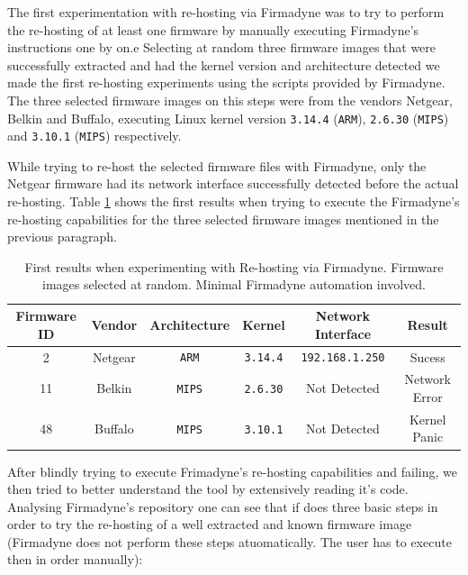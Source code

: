 
The first experimentation with re-hosting via Firmadyne was to try to perform the re-hosting of at least one firmware by manually executing Firmadyne's instructions one by on.e Selecting at random three firmware images that were successfully extracted and had the kernel version and architecture detected we made the first re-hosting experiments using the scripts provided by Firmadyne. The three selected firmware images on this steps were from the vendors Netgear, Belkin and Buffalo, executing Linux kernel version {\tt 3.14.4} ({\tt ARM}), {\tt 2.6.30} ({\tt MIPS}) and {\tt 3.10.1} ({\tt MIPS}) respectively.

While trying to re-host the selected firmware files with Firmadyne, only the Netgear firmware had its network interface successfully detected before the actual re-hosting. Table \ref{tab:fist-rehosting} shows the first results when trying to execute the Firmadyne's re-hosting capabilities for the three selected firmware images mentioned in the previous paragraph.

\begin{table}[H]
\centering
\caption{First results when experimenting with Re-hosting via Firmadyne. Firmware images selected at random. Minimal Firmadyne automation involved.}
\begin{tabular}{cccccc}
\hline
\textbf{Firmware ID} & \textbf{Vendor} & \textbf{Architecture} & \textbf{Kernel} & \textbf{Network Interface} & \textbf{Result} \\ \hline
2                    & Netgear         & {\tt ARM}                   & {\tt 3.14.4}                  & {\tt 192.168.1.250}                       &  Sucess                          \\
11                   & Belkin          & {\tt MIPS}                  & {\tt 2.6.30}                 & Not Detected                        &    Network Error                       \\
48                   & Buffalo         & {\tt MIPS}                 & {\tt 3.10.1}                 & Not Detected                        &        Kernel Panic                    \\ \hline
\end{tabular}
\label{tab:fist-rehosting}
\end{table}

After blindly trying to execute Frimadyne's re-hosting capabilities and failing, we then tried to better understand the tool by extensively reading it's code. Analysing Firmadyne's repository one can see that if does three basic steps in order to try the re-hosting of a well extracted and known firmware image (Firmadyne does not perform these steps atuomatically. The user has to execute then in order manually):

